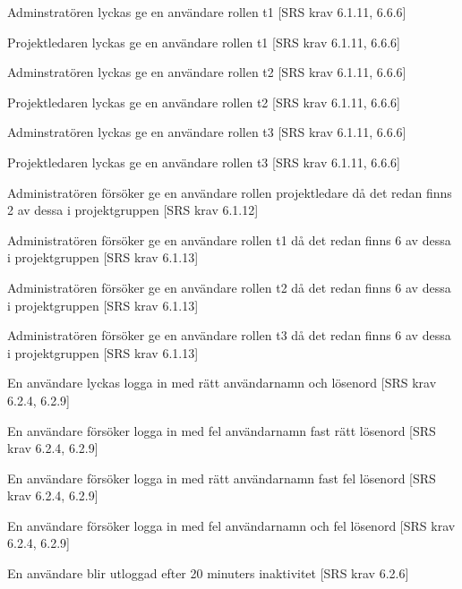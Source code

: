 \documentclass[a4paper]{article}
\begin{document}
\begin{appendices}
\begin{FT}
\item
Adminstratören lyckas ge en användare rollen t1 [SRS krav 6.1.11, 6.6.6]

\item
Projektledaren lyckas ge en användare rollen t1 [SRS krav 6.1.11, 6.6.6]

\item
Adminstratören lyckas ge en användare rollen t2 [SRS krav 6.1.11, 6.6.6]

\item
Projektledaren lyckas ge en användare rollen t2 [SRS krav 6.1.11, 6.6.6]

\item
Adminstratören lyckas ge en användare rollen t3 [SRS krav 6.1.11, 6.6.6]

\item
Projektledaren lyckas ge en användare rollen t3 [SRS krav 6.1.11, 6.6.6]

\item
Administratören försöker ge en användare rollen projektledare då det redan finns 2 av dessa i projektgruppen [SRS krav 6.1.12]

\item
Administratören försöker ge en användare rollen t1 då det redan finns 6 av dessa i projektgruppen [SRS krav 6.1.13]

\item
Administratören försöker ge en användare rollen t2 då det redan finns 6 av dessa i projektgruppen [SRS krav 6.1.13]

\item
Administratören försöker ge en användare rollen t3 då det redan finns 6 av dessa i projektgruppen [SRS krav 6.1.13]

\item
En användare lyckas logga in med rätt användarnamn och lösenord [SRS krav 6.2.4, 6.2.9]

\item
En användare försöker logga in med fel användarnamn fast rätt lösenord [SRS krav 6.2.4, 6.2.9]

\item
En användare försöker logga in med rätt användarnamn fast fel lösenord [SRS krav 6.2.4, 6.2.9]

\item
En användare försöker logga in med fel användarnamn och fel lösenord [SRS krav 6.2.4, 6.2.9]

\item 
En användare blir utloggad efter 20 minuters inaktivitet [SRS krav 6.2.6]


\end{FT}
\end{appendices}
\end{document}
